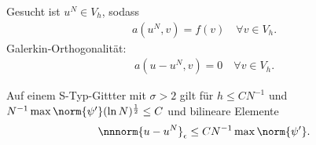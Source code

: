 Gesucht ist $u^{N} \in V_{h}$, sodass
\begin{align*}
  a(u^{N}, v) = f(v)  \quad \forall v \in V_{h}. 
\end{align*}
Galerkin-Orthogonalität:
\begin{align*}
  a(u - u^{N}, v) = 0 \quad \forall v \in V_{h}. 
\end{align*}
\begin{satz}\label{thm:7-13}
  Auf einem S-Typ-Gittter mit $\sigma > 2$ gilt für $h \leq CN^{-1}$ und $N^{-1} \max \norm{\psi'} (\ln N)^{\frac 12} \leq C$ und bilineare Elemente
  \begin{align*}
    \nnnorm{u - u^{N}}_{\epsilon} \leq C N^{-1}\max\norm{\psi'}. 
  \end{align*}

\end{satz}
